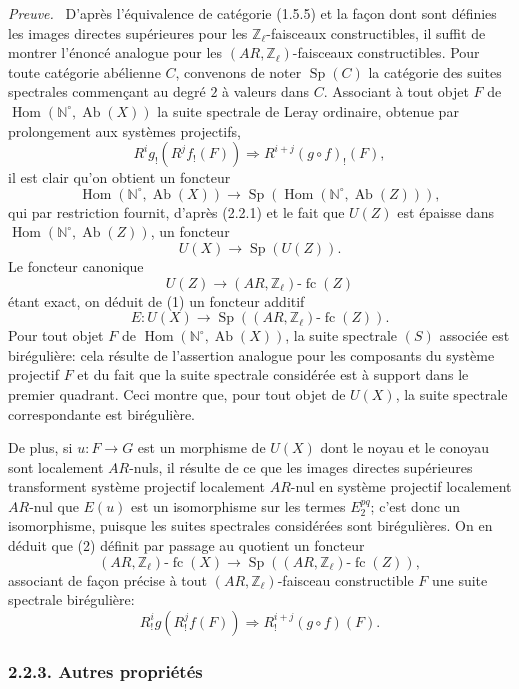 \documentclass[11pt]{article}
\newenvironment{prooftext}[1][Proof]{\par\noindent\emph{#1.}\ }{\par\medskip}
\DeclareMathOperator{\Hom}{Hom}
\providecommand{\Hom}{\operatorname{Hom}}
\providecommand{\Sp}{\operatorname{Sp}}
\providecommand{\Ab}{\operatorname{Ab}}
\providecommand{\fc}{\operatorname{fc}}
\providecommand{\Ab}{\operatorname{Ab}}
\begin{document}
\begin{prooftext}[Preuve]
D'après l'équivalence de catégorie (1.5.5) et la façon dont sont définies les images directes supérieures pour les \(\mathbb Z_\ell\)-faisceaux constructibles, il suffit de montrer l'énoncé analogue pour les \((AR,\mathbb Z_\ell)\)-faisceaux constructibles. Pour toute catégorie abélienne \(C\), convenons de noter \(\Sp(C)\) la catégorie des suites spectrales commençant au degré \(2\) à valeurs dans \(C\). Associant à tout objet \(F\) de \(\Hom(\mathbb N^\circ,\Ab(X))\) la suite spectrale de Leray ordinaire, obtenue par prolongement aux systèmes projectifs,
\[
R^i g_!(R^j f_!(F))\Longrightarrow R^{i+j}(g\circ f)_!(F),
\tag{S}
\]
il est clair qu'on obtient un foncteur
\[
\Hom(\mathbb N^\circ,\Ab(X))\longrightarrow \Sp(\Hom(\mathbb N^\circ,\Ab(Z))),
\]
qui par restriction fournit, d'après (2.2.1) et le fait que \(U(Z)\) est épaisse dans \(\Hom(\mathbb N^\circ,\Ab(Z))\), un foncteur
\[
U(X)\longrightarrow \Sp(U(Z)).
\tag{1}
\]
Le foncteur canonique
\[
U(Z)\longrightarrow (AR,\mathbb Z_\ell)\text{-}\fc(Z)
\]
étant exact, on déduit de (1) un foncteur additif
\[
E:U(X)\longrightarrow \Sp((AR,\mathbb Z_\ell)\text{-}\fc(Z)).
\tag{2}
\]
Pour tout objet \(F\) de \(\Hom(\mathbb N^\circ,\Ab(X))\), la suite spectrale \((S)\) associée est birégulière: cela résulte de l'assertion analogue pour les composants du système projectif \(F\) et du fait que la suite spectrale considérée est à support dans le premier quadrant. Ceci montre que, pour tout objet de \(U(X)\), la suite spectrale correspondante est birégulière.

De plus, si \(u:F\to G\) est un morphisme de \(U(X)\) dont le noyau et le conoyau sont localement \(AR\)-nuls, il résulte de ce que les images directes supérieures transforment système projectif localement \(AR\)-nul en système projectif localement \(AR\)-nul que \(E(u)\) est un isomorphisme sur les termes \(E_2^{pq}\); c'est donc un isomorphisme, puisque les suites spectrales considérées sont birégulières. On en déduit que (2) définit par passage au quotient un foncteur
\[
(AR,\mathbb Z_\ell)\text{-}\fc(X)
\longrightarrow \Sp((AR,\mathbb Z_\ell)\text{-}\fc(Z)),
\tag{3}
\]
associant de façon précise à tout \((AR,\mathbb Z_\ell)\)-faisceau constructible \(F\) une suite spectrale birégulière:
\[
R^i_!g(R^j_!f(F))\Longrightarrow R^{i+j}_!(g\circ f)(F).
\]
\end{prooftext}

\subsubsection*{2.2.3. Autres propriétés}
\end{document}
